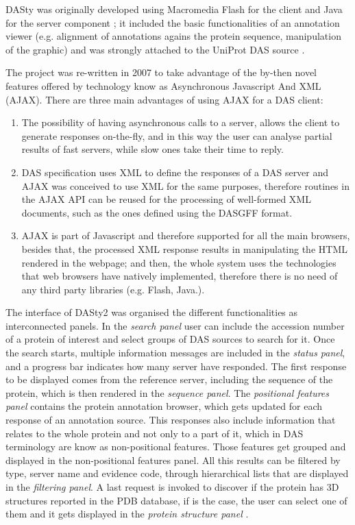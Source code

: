 DASty was originally developed using Macromedia Flash for the client and Java for the server component ; it included the basic functionalities of an annotation viewer (e.g.  alignment of annotations agains the protein sequence, manipulation of the graphic) and was strongly attached to the UniProt DAS source \cite{JON2005}. 

The project was re-written in 2007 to take advantage of the by-then novel features offered by technology know as Asynchronous Javascript And XML (AJAX). There are three main advantages of using AJAX for a DAS client:
\begin{enumerate}
\item The possibility of having asynchronous calls to a server, allows the client to generate responses on-the-fly, and in this way the user can analyse partial results of fast servers, while slow ones take their time to reply.
\item DAS specification uses XML to define the responses of a DAS server and AJAX was conceived to use XML for the same purposes, therefore routines in the AJAX API can be reused for the processing of well-formed XML documents, such as the ones defined using the DASGFF format.
\item AJAX is part of Javascript and therefore supported for all the main browsers, besides that, the processed XML response results in manipulating the HTML rendered in the webpage; and then, the whole system uses the technologies that web browsers have natively implemented, therefore there is no need of any third party libraries (e.g. Flash, Java.).
\end{enumerate}

The interface of DASty2 was organised the different functionalities as interconnected panels. In the \emph{search panel} user can include the accession number of a protein of interest and select groups of DAS sources to search for it. Once the search starts, multiple information messages are included in the \emph{status panel}, and a progress bar indicates how many server have responded. The first response to be displayed comes from the reference server, including the sequence of the protein, which is then rendered in the \emph{sequence panel}. The \emph{positional features panel} contains the protein annotation browser, which gets updated for each response of an annotation source. This responses also include information that relates to the whole protein and not only to a part of it, which in DAS terminology are know as non-positional features. Those features get grouped and displayed in the {non-positional features panel}. All this results can be filtered by type, server name and evidence code, through hierarchical lists that are displayed in the \emph{filtering panel}. A last request is invoked to discover if the protein has 3D structures reported in the PDB database, if is the case, the user can select one of them and it gets displayed in the \emph{protein structure panel} \cite{JIM2011}.

